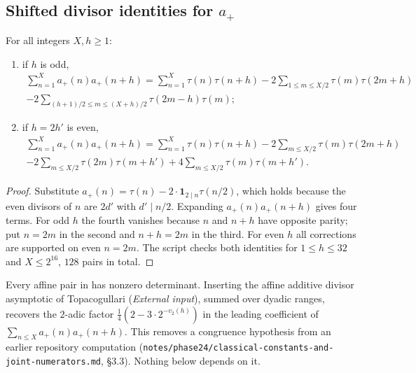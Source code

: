 \documentclass[11pt]{article}
\newcommand{\ttbreak}{\discretionary{}{}{}}
\newcommand{\ttt}[1]{\texttt{\begingroup\def\_{\textunderscore\ttbreak}#1\endgroup}}
\begin{document}
\subsection{\texorpdfstring{Shifted divisor identities for $a_+$}{Shifted divisor identities for a+}}

\begin{proposition}\label{prop:shifted}
For all integers $X,h\ge1$:
\begin{enumerate}[label=\textup{(\arabic*)},nosep]
\item if $h$ is odd,
\begin{multline*}
\sum_{n=1}^Xa_+(n)a_+(n+h)=\sum_{n=1}^X\tau(n)\tau(n+h)-2\sum_{1\le m\le X/2}\tau(m)\tau(2m+h)\\
-2\sum_{(h+1)/2\le m\le(X+h)/2}\tau(2m-h)\tau(m);
\end{multline*}
\item if $h=2h'$ is even,
\begin{multline*}
\sum_{n=1}^Xa_+(n)a_+(n+h)=\sum_{n=1}^X\tau(n)\tau(n+h)-2\sum_{m\le X/2}\tau(m)\tau(2m+h)\\
-2\sum_{m\le X/2}\tau(2m)\tau(m+h')+4\sum_{m\le X/2}\tau(m)\tau(m+h').
\end{multline*}
\end{enumerate}
\end{proposition}

\begin{proof}
Substitute $a_+(n)=\tau(n)-2\cdot\mathbf 1_{2\mid n}\tau(n/2)$, which holds because the even divisors of $n$ are $2d'$ with $d'\mid n/2$. Expanding $a_+(n)a_+(n+h)$ gives four terms. For odd $h$ the fourth vanishes because $n$ and $n+h$ have opposite parity; put $n=2m$ in the second and $n+h=2m$ in the third. For even $h$ all corrections are supported on even $n=2m$. The script checks both identities for $1\le h\le32$ and $X\le2^{16}$, $128$ pairs in total.
\end{proof}

\begin{remark}\label{rem:shifted}
Every affine pair in  has nonzero determinant. Inserting the affine additive divisor asymptotic of Topacogullari \cite{Topacogullari17} (\emph{External input}), summed over dyadic ranges, recovers the $2$-adic factor $\frac14(2-3\cdot2^{-v_2(h)})$ in the leading coefficient of $\sum_{n\le X}a_+(n)a_+(n+h)$. This removes a congruence hypothesis from an earlier repository computation (\ttt{notes/phase24/classical-constants-and-joint-numerators.md}, \S3.3). Nothing below depends on it.
\end{remark}
\end{document}
